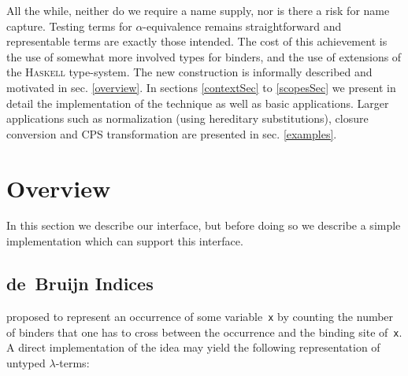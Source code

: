 \documentclass[9pt,authoryear]{sigplanconf}
\begin{document}
%
All the while, neither do we require a name supply, nor is there
    a risk for name capture. Testing terms for $ \alpha $-equivalence remains
    straightforward and representable terms are exactly those intended.
    The cost of this achievement is the use of somewhat more involved
    types for binders, and the use of extensions of the \textsc{Haskell}    type-system. The new construction is informally described and
    motivated in sec. \ref{overview}. In sections \ref{contextSec} to
    \ref{scopesSec} we present in detail the implementation of the
    technique as well as basic applications. Larger applications such as
    normalization (using hereditary substitutions), closure conversion
    and CPS transformation are presented in sec. \ref{examples}.%


\section{Overview\label{overview}}

%
In this section we describe our interface, but before doing so we 
    describe a simple implementation which can support this interface.%


\subsection{de{~}Bruijn Indices}

%
 proposed to represent an occurrence
    of some variable{~}\texttt{x} by counting the number of binders that one
    has to cross between the occurrence and the binding site of{~}\texttt{x}.
    A direct implementation of the idea may yield the following
    representation of untyped $ \lambda $-terms{:}%


{\nopagebreak }
\end{document}

